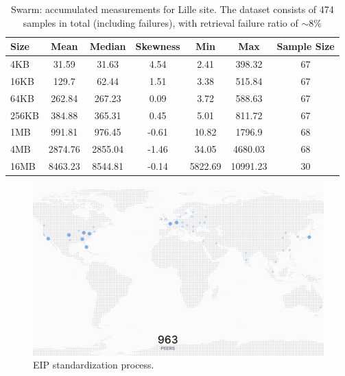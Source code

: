 \begin{table}[H]
\centering
\begin{small}
\caption{Swarm: accumulated measurements for Lille site. The dataset consists of 474 samples in total (including failures), with retrieval failure ratio of $\sim 8\%$ }
\begin{tabular}{@{}lcccccc@{}}
\toprule
Size & Mean & Median & Skewness & Min & Max & Sample Size \\ \midrule
4KB & 31.59 & 31.63 & 4.54 & 2.41 & 398.32 & 67\\
16KB & 129.7 & 62.44 & 1.51 & 3.38 & 515.84 & 67\\
64KB & 262.84 & 267.23 & 0.09 & 3.72 & 588.63 & 67\\
256KB & 384.88 & 365.31 & 0.45 & 5.01 & 811.72 & 67\\
1MB & 991.81 & 976.45 & -0.61 & 10.82 & 1796.9 & 68\\
4MB & 2874.76 & 2855.04 & -1.46 & 34.05 & 4680.03 & 68\\
16MB & 8463.23 & 8544.81 & -0.14 & 5822.69 & 10991.23 & 30\\
\bottomrule
\end{tabular}
\end{small}
\end{table}



\begin{figure}[htbp]
\centerline{\includegraphics[width=\textwidth]{figs/ipfs_peers.png}}
\caption{EIP standardization process.}
\label{fig:ipfs_peers}
\end{figure}